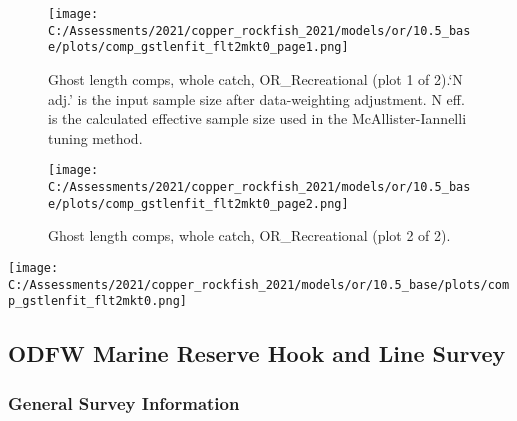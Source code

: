 \documentclass[11pt,
  english,
  a4paper,
]{article}
\begin{document}
\begin{figure}
\centering
\texttt{[image: C:/Assessments/2021/copper\_rockfish\_2021/models/or/10.5\_base/plots/comp\_gstlenfit\_flt2mkt0\_page1.png]}
\caption{Ghost length comps, whole catch, OR\_Recreational (plot 1 of 2).`N adj.' is the input sample size after data-weighting adjustment. N eff. is the calculated effective sample size used in the McAllister-Iannelli tuning method.\label{fig:comp_gstlenfit_flt2mkt0_page1}}
\end{figure}

\tagmcend\tagstructend


\begin{figure}
\centering
\texttt{[image: C:/Assessments/2021/copper\_rockfish\_2021/models/or/10.5\_base/plots/comp\_gstlenfit\_flt2mkt0\_page2.png]}
\caption{Ghost length comps, whole catch, OR\_Recreational (plot 2 of 2).\label{fig:comp_gstlenfit_flt2mkt0_page2}}
\end{figure}

\tagmcend\tagstructend


\texttt{[image: C:/Assessments/2021/copper\_rockfish\_2021/models/or/10.5\_base/plots/comp\_gstlenfit\_flt2mkt0.png]} \clearpage

\tagmcend\tagstructend


\hypertarget{append-survey}{%
\subsection{ODFW Marine Reserve Hook and Line Survey}\label{append-survey}}

\leavevmode\tagmcend\tagstructend


\hypertarget{general-survey-information}{%
\subsubsection{General Survey Information}\label{general-survey-information}}
\end{document}
